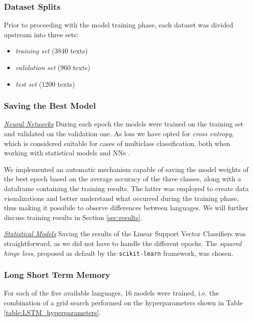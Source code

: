 \documentclass[letterpaper,11pt]{article}
\begin{document}
\subsubsection*{Dataset Splits}

Prior to proceeding with the model training phase, each dataset was divided upstream into three sets: 
\begin{itemize}
  \item \textit{training set} (3840 texts)
  \item \textit{validation set} (960 texts)
  \item \textit{test set} (1200 texts)
\end{itemize}

\subsubsection*{Saving the Best Model}

\underline{\textit{Neural Networks}} During each epoch the models were trained on the training set and validated on the validation one. As loss we have opted for \textit{cross entropy}, which is considered suitable for cases of multiclass classification, both when working with statistical models and NNs \cite{cross_entropy}.

We implemented an automatic mechanism capable of saving the model weights of the best epoch based on the average accuracy of the three classes, along with a dataframe containing the training results. The latter was employed to create data visualizations and better understand what occurred during the training phase, thus making it possibile to observe differences between languages. We will further discuss training results in Section \ref{sec:results}.

\underline{\textit{Statistical Models}} Saving the results of the Linear Support Vector Classifiers was straightforward, as we did not have to handle the different epochs. The \textit{squared hinge loss}, proposed as default by the \verb|scikit-learn| framework, was chosen.

\subsubsection*{Long Short Term Memory}

For each of the five available languages, 16 models were trained, i.e. the combination of a grid search performed on the hyperparameters shown in Table \ref{table:LSTM_hyperparameters}.
\end{document}
